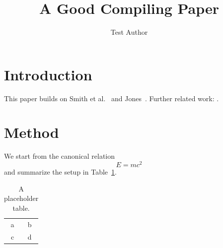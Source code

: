 \documentclass[twocolumn]{article}
\begin{document}
\title{A Good Compiling Paper}
\author{Test Author}
\maketitle

\section{Introduction}
This paper builds on Smith et al.~\cite{smith2020} and Jones~\cite{jones2021}.
Further related work: \cite{alice2021,bob2019,carol2020,dave2022,eve2023,frank2018}.

\section{Method}
We start from the canonical relation
\begin{equation}
  E = mc^2
\end{equation}
and summarize the setup in Table~\ref{tab:setup}.

\begin{table}[h]
  \centering
  \begin{tabular}{cc}
    a & b \\
    c & d \\
  \end{tabular}
  \caption{A placeholder table.}
  \label{tab:setup}
\end{table}



\end{document}

